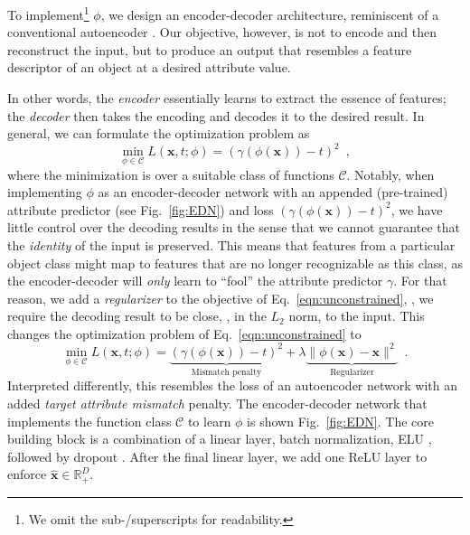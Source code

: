 \documentclass[10pt,twocolumn,letterpaper]{article}
\begin{document}
To implement\footnote{We omit the sub-/superscripts for readability.} $\phi$, we design an encoder-decoder
architecture, reminiscent of a conventional autoencoder \cite{Bengio09a}.
Our objective, however, is not to encode and then reconstruct 
the input, but to produce an output that 
resembles a feature descriptor of an object at a 
desired attribute value.

In other words, the \emph{encoder} essentially learns to extract
the essence of features; the \emph{decoder}
then takes the encoding and decodes it to the desired result. In
general, we can formulate the optimization problem as
\begin{equation}
\min_{\phi \in \mathcal{C}} L(\mathbf{x},t; \phi) = (\gamma(\phi(\mathbf{x}))-t)^2\enspace,
\label{eqn:unconstrained}
\end{equation}
where the minimization is 
over a suitable class of functions $\mathcal{C}$. Notably, when 
implementing $\phi$ as an encoder-decoder network with an 
appended (pre-trained) attribute predictor (see Fig.~\ref{fig:EDN})
and loss $(\gamma(\phi(\mathbf{x}))-t)^2$, we have little control 
over the decoding results in the sense that we cannot guarantee 
that the \emph{identity} of the input is preserved. This means
that features from a particular object class might map to 
features that are no longer recognizable as
this class, as the encoder-decoder will \emph{only} learn to ``fool'' the 
attribute predictor $\gamma$.
For that reason, we add a \emph{regularizer} to the objective
of Eq.~\eqref{eqn:unconstrained}, \ie, we require the 
decoding result to be close, \eg, in the $L_2$ norm, to the
input. This changes the optimization problem of Eq.~\eqref{eqn:unconstrained} to
\begin{equation}
\min_{\phi \in \mathcal{C}} L(\mathbf{x},t; \phi) = \underbrace{(\gamma(\phi(\mathbf{x}))-t)^2}_\text{Mismatch penalty} + 
\lambda \underbrace{\| \phi(\mathbf{x}) - \mathbf{x} \|^2}_{\text{Regularizer}}
\enspace.
\label{eqn:constrained}
\end{equation}
Interpreted differently, this resembles the loss of an autoencoder 
network with an added \emph{target attribute mismatch} penalty. 
The encoder-decoder network that implements the function class $\mathcal{C}$ 
to learn $\phi$ is shown Fig.~\ref{fig:EDN}. 
The core building block is a combination of a linear layer, 
batch normalization, ELU \cite{Clevert16a}, followed by dropout 
\cite{Srivastava14a}. After the final linear
layer, we add one ReLU layer to enforce $\hat{\mathbf{x}} \in \mathbb{R}^D_+$.
\end{document}

